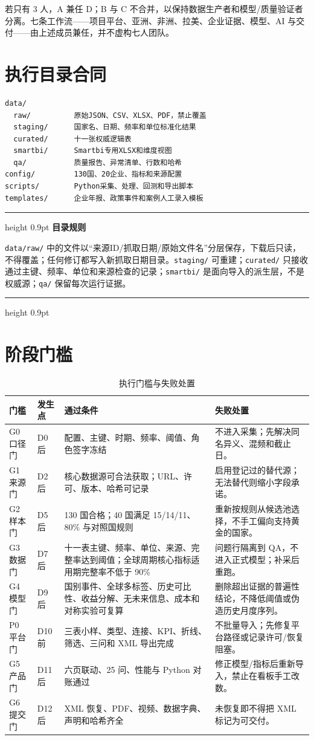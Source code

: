 \documentclass[UTF8,fontset=windows,12pt,openany]{ctexbook}
\newenvironment{warningbox}[1][]{%
  \par\medskip\noindent\begin{center}\begin{minipage}{0.93\textwidth}%
  \color{TextGray}\hrule height 0.9pt\vspace{0.45em}%
  \textbf{#1}\par\smallskip\color{black}%
}{%
  \par\vspace{0.35em}\color{TextGray}\hrule height 0.9pt%
  \end{minipage}\end{center}\medskip%
}
\newcommand{\File}[1]{{\small\nolinkurl{#1}}}
\begin{document}
若只有 3 人，A 兼任 D；B 与 C 不合并，以保持数据生产者和模型/质量验证者分离。七条工作流——项目平台、亚洲、非洲、拉美、企业证据、模型、AI 与交付——由上述成员兼任，并不虚构七人团队。

\section{执行目录合同}

\begin{verbatim}
data/
  raw/          原始JSON、CSV、XLSX、PDF，禁止覆盖
  staging/      国家名、日期、频率和单位标准化结果
  curated/      十一张权威逻辑表
  smartbi/      Smartbi专用XLSX和维度视图
  qa/           质量报告、异常清单、行数和哈希
config/         130国、20企业、指标和来源配置
scripts/        Python采集、处理、回测和导出脚本
templates/      企业年报、政策事件和案例人工录入模板
\end{verbatim}

\begin{warningbox}[目录规则]
\File{data/raw/} 中的文件以“来源ID/抓取日期/原始文件名”分层保存，下载后只读，不得覆盖；任何修订都写入新抓取日期目录。\File{staging/} 可重建；\File{curated/} 只接收通过主键、频率、单位和来源检查的记录；\File{smartbi/} 是面向导入的派生层，不是权威源；\File{qa/} 保留每次运行证据。
\end{warningbox}

\section{阶段门槛}

\begin{longtable}{p{1.8cm}p{3.3cm}p{5.0cm}p{3.4cm}}
\caption{执行门槛与失败处置}\label{tab:gates}\\
\toprule
\textbf{门槛} & \textbf{发生点} & \textbf{通过条件} & \textbf{失败处置}\\
\midrule
G0 口径门 & D0 后 & 配置、主键、时期、频率、阈值、角色签字冻结 & 不进入采集；先解决同名异义、混频和截止日。\\
G1 来源门 & D2 后 & 核心数据源可合法获取；URL、许可、版本、哈希可记录 & 启用登记过的替代源；无法替代则缩小字段承诺。\\
G2 样本门 & D5 后 & 130 国合格；40 国满足 15/14/11、80\% 与对照国规则 & 重新按规则从候选池选择，不手工偏向支持黄金的国家。\\
G3 数据门 & D7 后 & 十一表主键、频率、单位、来源、完整率达到阈值；全球周期核心指标适用期完整率不低于 90\% & 问题行隔离到 QA，不进入正式模型；补采后重跑。\\
G4 模型门 & D9 后 & 国别事件、全球多标签、历史可比性、收益分解、无未来信息、成本和对称实验可复算 & 删除超出证据的普遍性结论，不降低阈值或伪造历史月度序列。\\
P0 平台门 & D10 前 & 三表小样、类型、连接、KPI、折线、筛选、三问和 XML 导出完成 & 不批量导入；先修复平台路径或记录许可/恢复阻塞。\\
G5 产品门 & D11 后 & 六页联动、25 问、性能与 Python 对账通过 & 修正模型/指标后重新导入，禁止在看板手工改数。\\
G6 提交门 & D12 后 & XML 恢复、PDF、视频、数据字典、声明和哈希齐全 & 未恢复即不得把 XML 标记为可交付。\\
\bottomrule
\end{longtable}
\end{document}
